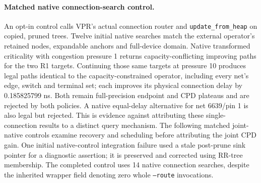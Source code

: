 \paragraph{Matched native connection-search control.}
An opt-in control calls VPR's actual connection router and \texttt{update\_from\_heap} on copied, pruned trees. Twelve initial native searches match the external operator's retained nodes, expandable anchors and full-device domain. Native transformed criticality with congestion pressure 1 returns capacity-conflicting improving paths for the two R1 targets. Continuing those same targets at pressure 10 produces legal paths identical to the capacity-constrained operator, including every net's edge, switch and terminal set; each improves its physical connection delay by 0.185825799 ns. Both remain full-precision endpoint and CPD plateaus and are rejected by both policies. A native equal-delay alternative for net 6639/pin 1 is also legal but rejected. This is evidence against attributing these single-connection results to a distinct query mechanism. The following matched joint-native controls examine recovery and scheduling before attributing the joint CPD gain. One initial native-control integration failure used a stale post-prune sink pointer for a diagnostic assertion; it is preserved and corrected using RR-tree membership. The completed control uses 14 native connection searches, despite the inherited wrapper field denoting zero whole \texttt{--route} invocations.
